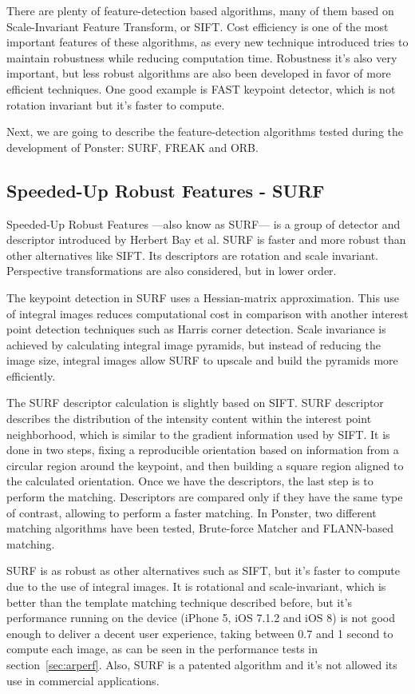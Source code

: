 There are plenty of feature-detection based algorithms, many of them based on
Scale-Invariant Feature Transform, or SIFT. Cost efficiency is one of the most
important features of these algorithms, as every new technique introduced tries to
maintain robustness while reducing computation time. Robustness it's also very
important, but less robust algorithms are also been developed in favor of more
efficient techniques. One good example is FAST\cite{6126544} keypoint detector, which is
not rotation invariant but it's faster to compute.

Next, we are going to describe the feature-detection algorithms tested during the
development of Ponster: SURF, FREAK and ORB.

\subsection{Speeded-Up Robust Features - SURF}
Speeded-Up Robust Features ---also know as SURF--- is a group of detector and descriptor
introduced by Herbert Bay et al. SURF is faster and more robust than other
alternatives like SIFT\cite{Bay:2008:SRF:1370312.1370556}. Its descriptors are
rotation and scale invariant. Perspective transformations are also considered, but
in lower order.  

The keypoint detection in SURF uses a Hessian-matrix approximation. This use of
integral images reduces computational cost in comparison with another interest point
detection techniques such as Harris corner detection. Scale invariance is achieved
by calculating integral image pyramids, but instead of reducing the image size,
integral images allow SURF to upscale and build the pyramids more efficiently. 

The SURF descriptor calculation is slightly based on SIFT. SURF descriptor describes
the distribution of the intensity content within the interest point neighborhood,
which is similar to the gradient information used by SIFT. It is done in two steps,
fixing a reproducible orientation based on information from a circular region around
the keypoint, and then building a square region aligned to the calculated
orientation. Once we have the descriptors, the last step is to perform the
matching. Descriptors are compared only if they have the same type of contrast,
allowing to perform a faster matching. In Ponster, two different matching algorithms
have been tested, Brute-force Matcher and FLANN-based matching.

SURF is as robust as other alternatives such as SIFT, but it's faster to compute due
to the use of integral images. It is rotational and scale-invariant, which is better
than the template matching technique described before, but it's performance running
on the device (iPhone 5, iOS 7.1.2 and iOS 8) is not good enough to deliver a decent user
experience, taking between 0.7 and 1 second to compute each image, as can be
seen in the performance tests in section~\ref{sec:arperf}. Also, SURF is a
patented algorithm and it's not allowed its use in commercial applications. 

